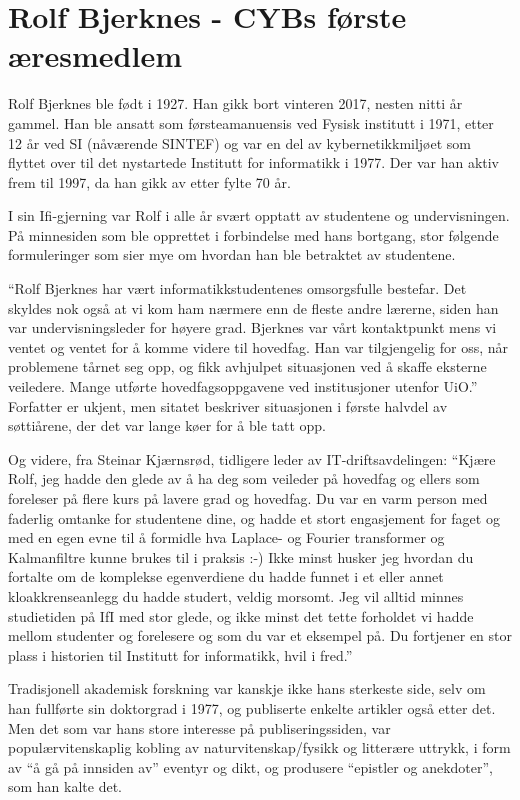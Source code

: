 \chapter[Rolf Bjerknes]{Rolf Bjerknes - CYBs første æresmedlem}

\author{Skrevet av Narve Trædal}

Rolf Bjerknes ble født i 1927. Han gikk bort vinteren 2017, nesten nitti år gammel. Han ble ansatt som førsteamanuensis ved Fysisk institutt i 1971, etter 12 år ved SI (nåværende SINTEF) og var en del av kybernetikkmiljøet som flyttet over til det nystartede Institutt for informatikk i 1977. Der var han
aktiv frem til 1997, da han gikk av etter fylte 70 år.

I sin Ifi-gjerning var Rolf i alle år svært opptatt av studentene og undervisningen. På minnesiden som ble opprettet i forbindelse med hans bortgang, stor følgende formuleringer som sier mye om hvordan han ble betraktet av studentene.

``Rolf Bjerknes har vært informatikkstudentenes omsorgsfulle bestefar. Det skyldes nok også at vi kom ham nærmere enn de fleste andre lærerne, siden han var undervisningsleder for høyere grad. Bjerknes var vårt kontaktpunkt mens vi ventet og ventet for å komme videre til hovedfag. Han var tilgjengelig for oss, når problemene tårnet seg opp, og fikk avhjulpet situasjonen ved å skaffe eksterne veiledere. Mange utførte hovedfagsoppgavene ved institusjoner utenfor UiO.'' Forfatter er ukjent, men sitatet beskriver situasjonen i første halvdel av søttiårene, der det var lange køer for å ble tatt opp.

Og videre, fra Steinar Kjærnsrød, tidligere leder av IT-driftsavdelingen: ``Kjære Rolf, jeg hadde den glede av å ha deg som veileder på hovedfag og ellers som foreleser på flere kurs på lavere grad og hovedfag. Du var en varm person med faderlig omtanke for studentene dine, og hadde et stort engasjement for faget og med en egen evne til å formidle hva Laplace- og Fourier transformer og Kalmanfiltre kunne brukes til i praksis :-) Ikke minst husker jeg hvordan du fortalte om de komplekse egenverdiene du hadde funnet i et eller annet kloakkrenseanlegg du hadde studert, veldig morsomt. Jeg vil alltid minnes studietiden på IfI med stor glede, og ikke minst det tette forholdet vi hadde mellom studenter og forelesere og som du var et eksempel på. Du fortjener en stor plass i historien til Institutt for informatikk, hvil i fred.''


Tradisjonell akademisk forskning var kanskje ikke hans sterkeste side, selv om han fullførte sin doktorgrad i 1977, og publiserte enkelte artikler også etter det. Men det som var hans store interesse på publiseringssiden, var populærvitenskaplig kobling av naturvitenskap/fysikk og litterære uttrykk, i form av ``å gå på innsiden av'' eventyr og dikt, og produsere ``epistler og anekdoter'', som han kalte det.
